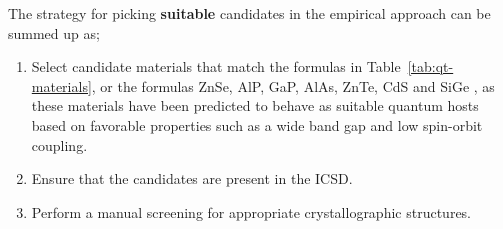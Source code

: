 \documentclass[superscriptaddress,unsortedaddress,
 amsmath,amssymb,
 aps,
]{revtex4-2}
\begin{document}

The strategy for picking \textbf{suitable} candidates in the empirical approach can be summed up as;  
\begin{enumerate}
    \item Select candidate materials that match the formulas in  Table~\ref{tab:qt-materials}, or the formulas ZnSe, AlP, GaP, AlAs, ZnTe, CdS \cite{Weber2010} and SiGe \cite{Hardy2019}, as these materials have been predicted to behave as suitable quantum hosts based on favorable properties such as a wide band gap and low spin-orbit coupling.  
    \item Ensure that the candidates are present in the ICSD.  
    \item Perform a manual screening for appropriate crystallographic structures. 
\end{enumerate}
\end{document}
